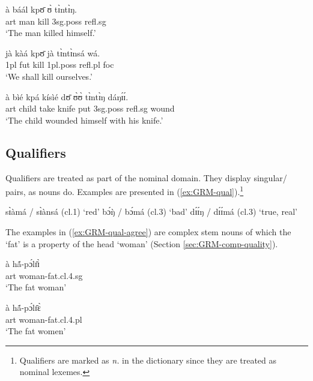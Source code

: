 \begin{exe}
\begin{exe}
\begin{exe}
\begin{exe}
\begin{exe}
\begin{exe}
\begin{exe}
\begin{exe}
\begin{exe}
 \ea\label{ex:GRM-reflex}
  
   
\ea\label{ex:vp25.1.}
\gll  à báál kpʊ̄ ʊ̀ tɪ̀ntɪ̀ŋ.\\
   {\sc art} man kill  {\sc 3sg.poss} {\sc refl.sg}\\
\glt  `The man killed himself.' 

\ex\label{ex:vp25.2.}
\gll jà kàá kpʊ̄ jà tɪ̀ntɪ̀nsá wá.\\
  {\sc 1pl}  {\sc fut} kill {\sc 1pl.poss}  {\sc refl.pl} {\sc foc}\\
\glt  `We shall kill {\sc ourselves}.'

\ex\label{ex:vp25.4.}
\gll à bìé kpá kísìé dʊ̄ ʊ̀ʊ̀ tɪ̀ntɪ̀ŋ dáŋɪ́ɪ́.\\
    {\sc art} child take knife put  {\sc 3sg.poss}   {\sc
refl.sg} wound\\
\glt  `The child wounded himself with his knife.' 
  
   
  \z 
 \z




\subsection{Qualifiers}
\label{sec:GRM-qualifier}

Qualifiers are treated  as part of the nominal domain. They display singular/ pairs, as  nouns do. Examples are presented in (\ref{ex:GRM-qual}).\footnote{Qualifiers are marked as {\it n.} in the dictionary since they are treated as nominal lexemes.}

\ea\label{ex:GRM-qual}
 
  \ea\label{ex:GRM-qual-red}
sɪ̀àmá {\rm /} sɪ̀ànsá   {\rm ({\sc cl.}1) `red'}
  \ex\label{ex:GRM-qual-bad}
 bɔ́ŋ̀ {\rm /}  bɔ́má   {\rm  ({\sc cl.}3)  `bad'}
  \ex\label{ex:GRM-qual-real}
dɪ́ɪ́ŋ {\rm /} dɪ́ɪ́má  {\rm  ({\sc cl.}3) `true, real'}

\z 
 \z


The examples in (\ref{ex:GRM-qual-agree}) are complex stem nouns  of which the   `fat'  is 
a property of   the head `woman'  (Section \ref{sec:GRM-comp-quality}).

\ea\label{ex:GRM-qual-agree}

  \ea\label{ex:GRM-qual-agree-sg}
\gll à  hã́-pɔ́lɪ̄ɪ̀\\
{\sc art} woman-fat.{\sc cl.4.sg}\\
\glt `The fat woman' 

  \ex\label{ex:GRM-qual-agree-pl}
\gll à hã́-pɔ́lɪ̄ɛ̀\\
{\sc art} woman-fat.{\sc cl.4.pl}\\
\glt `The fat women'
 

\end{exe}
\end{exe}
\end{exe}
\end{exe}
\end{exe}
\end{exe}
\end{exe}
\end{exe}
\end{exe}
